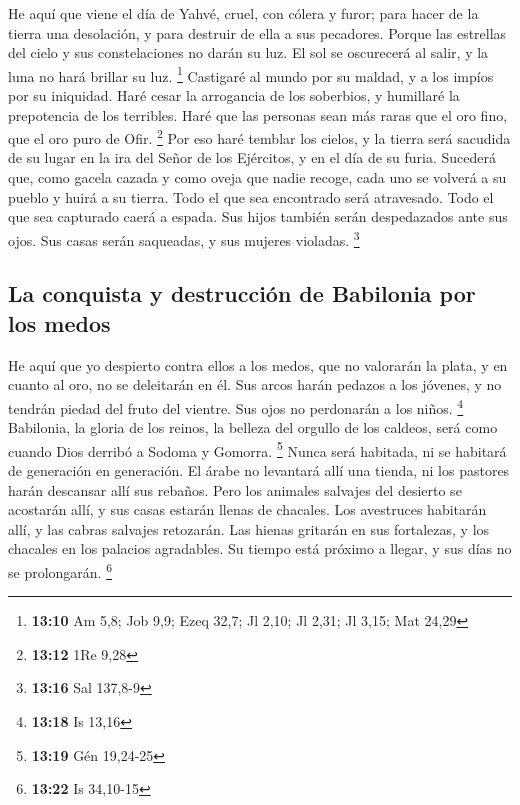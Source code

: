  He aquí que viene el día de Yahvé, cruel, con cólera y
furor; para hacer de la tierra una desolación, y para destruir de ella a
sus pecadores.  Porque las estrellas del cielo y sus
constelaciones no darán su luz. El sol se oscurecerá al salir, y la luna
no hará brillar su luz. \footnote{\textbf{13:10} Am 5,8; Job 9,9; Ezeq
  32,7; Jl 2,10; Jl 2,31; Jl 3,15; Mat 24,29}  Castigaré
al mundo por su maldad, y a los impíos por su iniquidad. Haré cesar la
arrogancia de los soberbios, y humillaré la prepotencia de los
terribles.  Haré que las personas sean más raras que el
oro fino, que el oro puro de Ofir. \footnote{\textbf{13:12} 1Re 9,28}
 Por eso haré temblar los cielos, y la tierra será
sacudida de su lugar en la ira del Señor de los Ejércitos, y en el día
de su furia.  Sucederá que, como gacela cazada y como
oveja que nadie recoge, cada uno se volverá a su pueblo y huirá a su
tierra.  Todo el que sea encontrado será atravesado. Todo
el que sea capturado caerá a espada.  Sus hijos también
serán despedazados ante sus ojos. Sus casas serán saqueadas, y sus
mujeres violadas. \footnote{\textbf{13:16} Sal 137,8-9}

\hypertarget{la-conquista-y-destrucciuxf3n-de-babilonia-por-los-medos}{%
\subsection{La conquista y destrucción de Babilonia por los
medos}\label{la-conquista-y-destrucciuxf3n-de-babilonia-por-los-medos}}

 He aquí que yo despierto contra ellos a los medos, que
no valorarán la plata, y en cuanto al oro, no se deleitarán en él.
 Sus arcos harán pedazos a los jóvenes, y no tendrán
piedad del fruto del vientre. Sus ojos no perdonarán a los niños.
\footnote{\textbf{13:18} Is 13,16}  Babilonia, la gloria
de los reinos, la belleza del orgullo de los caldeos, será como cuando
Dios derribó a Sodoma y Gomorra. \footnote{\textbf{13:19} Gén 19,24-25}
 Nunca será habitada, ni se habitará de generación en
generación. El árabe no levantará allí una tienda, ni los pastores harán
descansar allí sus rebaños.  Pero los animales salvajes
del desierto se acostarán allí, y sus casas estarán llenas de chacales.
Los avestruces habitarán allí, y las cabras salvajes retozarán.
 Las hienas gritarán en sus fortalezas, y los chacales en
los palacios agradables. Su tiempo está próximo a llegar, y sus días no
se prolongarán. \footnote{\textbf{13:22} Is 34,10-15}


